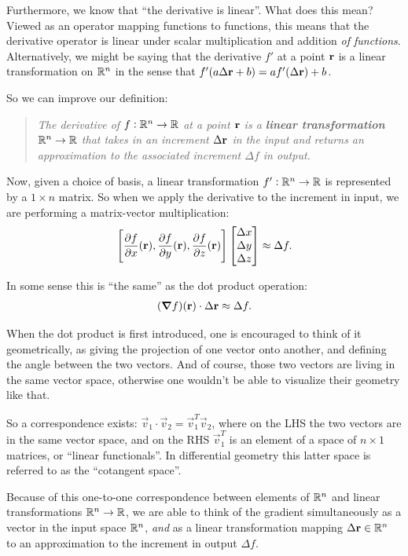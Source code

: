 Furthermore, we know that ``the derivative is linear''. What does this mean? Viewed as an operator
mapping functions to functions, this means that the derivative operator is linear under scalar
multiplication and addition \emph{of functions}. Alternatively, we might be saying that the
derivative $f'$ at a point $\mathbf{r}$ is a linear transformation on $\mathbb{R}^n$ in the sense that
$f'(a\Delta \mathbf{r} + b) = af'(\Delta\mathbf{r}) + b$.

So we can improve our definition:
\begin{quote}
  \emph{
    The derivative of $f:\mathbb{R}^n \to \mathbb{R}$ at a point $\mathbf{r}$ is a \textbf{linear transformation}
    $\mathbb{R}^n \to \mathbb{R}$ that takes in an increment $\Delta \mathbf{r}$ in the input and returns an approximation to the
    associated increment $\Delta f$ in output.
  }
\end{quote}

Now, given a choice of basis, a linear transformation $f':\mathbb{R}^n \to \mathbb{R}$ is represented by a
$1 \times n$ matrix. So when we apply the derivative to the increment in input, we are performing a
matrix-vector multiplication:
\begin{align*}
  \Bigg[\frac{\partial f}{\partial x}(\mathbf{r}), \frac{\partial f}{\partial y}(\mathbf{r}), \frac{\partial f}{\partial z}(\mathbf{r})\Bigg] \begin{bmatrix}\Delta x\\\Delta y\\\Delta z\end{bmatrix} \approx \Delta f.
\end{align*}

In some sense this is ``the same'' as the dot product operation:
\begin{align*}
  (\grad f)(\mathbf{r}) \cdot \Delta\mathbf{r} \approx \Delta f.
\end{align*}

When the dot product is first introduced, one is encouraged to think of it geometrically, as giving
the projection of one vector onto another, and defining the angle between the two vectors. And of
course, those two vectors are living in the same vector space, otherwise one wouldn't be able to
visualize their geometry like that.

So a correspondence exists: $\vec v_1 \cdot \vec v_2 = \vec v_1^T \vec v_2$, where on the LHS the two
vectors are in the same vector space, and on the RHS $\vec v_1^T$ is an element of a space of
$n \times 1$ matrices, or ``linear functionals''. In differential geometry this latter space is referred
to as the ``cotangent space''.


Because of this one-to-one correspondence between elements of $\mathbb{R}^n$ and linear transformations
$\mathbb{R}^n \to \mathbb{R}$, we are able to think of the gradient simultaneously as a vector in the input space
$\mathbb{R}^n$, \emph{and} as a linear transformation mapping $\Delta\mathbf{r} \in \mathbb{R}^n$ to an approximation to the
increment in output $\Delta f$.

